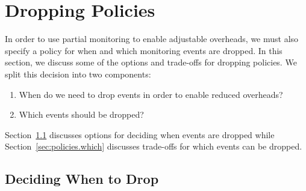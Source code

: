 \section{Dropping Policies}
\label{sec:policies}

In order to use partial monitoring to enable adjustable overheads, we must also
specify a policy for when and which monitoring events are dropped. In this
section, we discuss some of the options and trade-offs for dropping policies.
We split this decision into two components:
\begin{enumerate}
  \item When do we need to drop events in order to enable reduced overheads?
  \item Which events should be dropped?
\end{enumerate}

Section~\ref{sec:policies.when} discusses options for deciding when events are
dropped while Section~\ref{sec:policies.which} discusses trade-offs for which
events can be dropped. 


\subsection{Deciding When to Drop}
\label{sec:policies.when}


